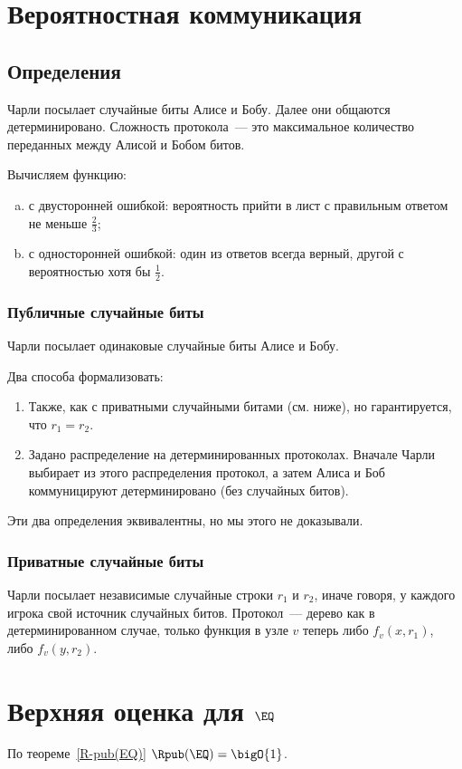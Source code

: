 \section{Вероятностная коммуникация}

\subsection{Определения}
Чарли посылает случайные биты Алисе и Бобу. Далее они общаются детерминировано. Сложность протокола~---
это максимальное количество переданных между Алисой и Бобом битов. 

Вычисляем функцию:
\begin{enumerate}[a)]
    \item с двусторонней ошибкой: вероятность прийти в лист с правильным ответом не меньше $\frac{2}{3}$;
    \item с односторонней ошибкой: один из ответов всегда верный, другой с вероятностью хотя бы
        $\frac{1}{2}$.
\end{enumerate}

\subsubsection{Публичные случайные биты}
Чарли посылает одинаковые случайные биты Алисе и Бобу.

Два способа формализовать:
\begin{enumerate}
    \item Также, как с приватными случайными битами (см. ниже), но гарантируется, что $r_1 = r_2$.
    \item Задано распределение на детерминированных протоколах. Вначале Чарли выбирает из этого
        распределения протокол, а затем Алиса и Боб коммуницируют детерминировано (без случайных битов).
\end{enumerate}

Эти два определения эквивалентны, но мы этого не доказывали.

\subsubsection{Приватные случайные биты}
Чарли посылает независимые случайные строки $r_1$ и $r_2$, иначе говоря, у каждого игрока свой источник
случайных битов. Протокол~--- дерево как в детерминированном случае, только функция в узле $v$ теперь
либо $f_v(x, r_1)$, либо $f_v(y, r_2)$. 

\section{Верхняя оценка для \texorpdfstring{$\EQ$}{EQ}}
По теореме~\ref{R-pub(EQ)} $\Rpub(\EQ) = \bigO{1}$.

